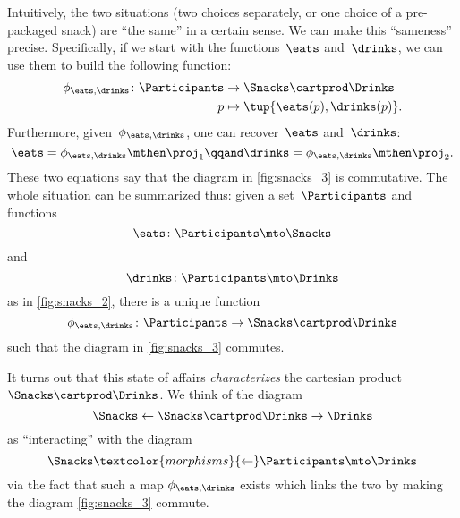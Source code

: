 Intuitively, the two situations (two choices separately, or one choice of a pre-packaged snack) are ``the same'' in a certain sense.
We can make this ``sameness'' precise.
Specifically, if we start with the functions~$\eats$ and~$\drinks$, we can use them to build the following function:
\begin{equation}
    \label{eq:snacks-building-univ-map}
    \begin{aligned}
        \phi_{\eats,\drinks}\colon \Participants & \to \Snacks\cartprod \Drinks \\
        p                                        & \mapsto \tup{\eats(p),\drinks(p)}.
    \end{aligned}
\end{equation}
Furthermore, given~$\phi_{\eats,\drinks}$, one can recover~$\eats$ and~$\drinks$:
\begin{equation}
    \label{eq:snacks-proj-univ-map}
    \eats =\phi_{\eats,\drinks}\mthen \proj_1 \qqand \drinks=\phi_{\eats,\drinks}\mthen \proj_2.
\end{equation}
These two equations say that the diagram in \cref{fig:snacks_3} is commutative.
The whole situation can be summarized thus: given a set~$\Participants$ and functions
\begin{equation*}
    \eats\colon \Participants \mto \Snacks
\end{equation*}
and
\begin{equation*}
    \drinks\colon \Participants \mto \Drinks
\end{equation*}
as in \cref{fig:snacks_2}, there is a unique function
\begin{equation}
    \label{eq:snacks-unique-univ-map}
    \phi_{\eats,\drinks} \colon \Participants \to \Snacks \cartprod \Drinks
\end{equation}
such that the diagram in \cref{fig:snacks_3} commutes.

\begin{figure*}[h!]
    \centering
    \caption{Choosing food and drink separately is essentially the same as choosing a combination of the two. }
    \label{fig:snacks_3}
\end{figure*}

It turns out that this state of affairs \emph{characterizes} the cartesian product $\Snacks\cartprod \Drinks$.
We think of the diagram
%
\begin{equation}
    \label{eq:snacks-prod-diagram}
    \Snacks \leftarrow \Snacks \cartprod \Drinks \rightarrow \Drinks
\end{equation}
as ``interacting'' with the diagram
\begin{equation}
    \label{eq:snacks-prod-test-diagram}
    \Snacks \textcolor{morphisms}{\leftarrow} \Participants \mto \Drinks
\end{equation}
via the fact that such a map $\phi_{\eats,\drinks}$ exists which links the two by making the diagram \cref{fig:snacks_3} commute.

